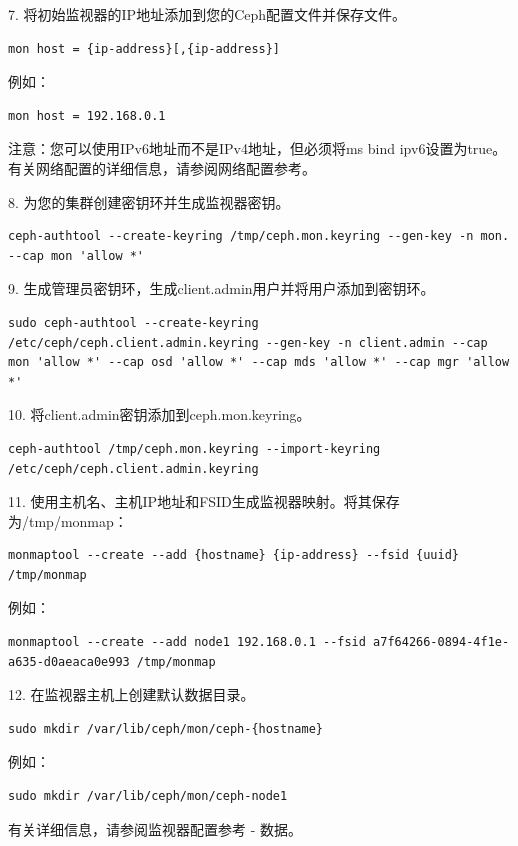 \documentclass[12pt,UTF8]{ctexbook}
\begin{document}
7. 将初始监视器的IP地址添加到您的Ceph配置文件并保存文件。
\begin{verbatim}
mon host = {ip-address}[,{ip-address}]
\end{verbatim}

例如：
\begin{verbatim}
mon host = 192.168.0.1
\end{verbatim}

注意：您可以使用IPv6地址而不是IPv4地址，但必须将ms bind ipv6设置为true。有关网络配置的详细信息，请参阅网络配置参考。

8. 为您的集群创建密钥环并生成监视器密钥。
\begin{verbatim}
ceph-authtool --create-keyring /tmp/ceph.mon.keyring --gen-key -n mon. --cap mon 'allow *'
\end{verbatim}

9. 生成管理员密钥环，生成client.admin用户并将用户添加到密钥环。
\begin{verbatim}
sudo ceph-authtool --create-keyring /etc/ceph/ceph.client.admin.keyring --gen-key -n client.admin --cap mon 'allow *' --cap osd 'allow *' --cap mds 'allow *' --cap mgr 'allow *'
\end{verbatim}

10. 将client.admin密钥添加到ceph.mon.keyring。
\begin{verbatim}
ceph-authtool /tmp/ceph.mon.keyring --import-keyring /etc/ceph/ceph.client.admin.keyring
\end{verbatim}

11. 使用主机名、主机IP地址和FSID生成监视器映射。将其保存为/tmp/monmap：
\begin{verbatim}
monmaptool --create --add {hostname} {ip-address} --fsid {uuid} /tmp/monmap
\end{verbatim}

例如：
\begin{verbatim}
monmaptool --create --add node1 192.168.0.1 --fsid a7f64266-0894-4f1e-a635-d0aeaca0e993 /tmp/monmap
\end{verbatim}

12. 在监视器主机上创建默认数据目录。
\begin{verbatim}
sudo mkdir /var/lib/ceph/mon/ceph-{hostname}
\end{verbatim}

例如：
\begin{verbatim}
sudo mkdir /var/lib/ceph/mon/ceph-node1
\end{verbatim}

有关详细信息，请参阅监视器配置参考 - 数据。
\end{document}
